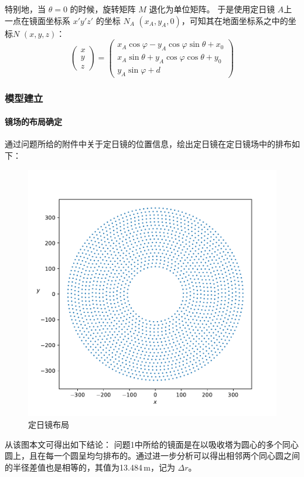\documentclass[../main.tex]{subfiles}
\begin{document}
特别地，当 \(\theta = 0\) 的时候，旋转矩阵 \(M\) 退化为单位矩阵。
于是使用定日镜 \(A\)上一点在镜面坐标系 \(x'y'z'\) 的坐标 \(N_{A}\) \((x_{A}, y_{A},0)\)，可知其在地面坐标系之中的坐标\(N\) \((x, y , z)\)：
\begin{equation}
\begin{pmatrix}
x\\
y\\
z
\end{pmatrix}
=
\begin{pmatrix}
x_{A} \cos \varphi - y_{A} \cos \varphi \sin \theta + x_0\\
x_{A} \sin \theta + y_{A} \cos \varphi \cos \theta + y_{0} \\
y_{A} \sin \varphi + d
\end{pmatrix}
\end{equation}


\subsubsection{模型建立}
\paragraph{镜场的布局确定} 通过问题所给的附件中关于定日镜的位置信息，绘出定日镜在定日镜场中的排布如下：
%
\begin{figure}[H]
\centering
\includegraphics[scale = 0.5]{arange_1.pdf}
\caption{\kaishu 定日镜布局}\label{arange_1}
\end{figure}
%
从该图本文可得出如下结论：
问题1中所给的镜面是在以吸收塔为圆心的多个同心圆上，且在每一个圆呈均匀排布的。通过进一步分析可以得出相邻两个同心圆之间的半径差值也是相等的，其值为13.484\(\,\mathrm{m}\)，记为 \(\Delta r\)。
\end{document}
